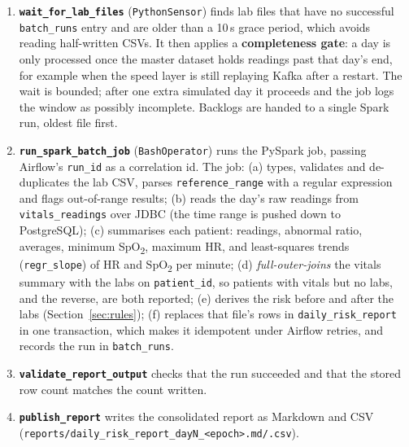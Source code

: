 \documentclass[11pt,a4paper]{article}
\newcommand{\code}[1]{\nolinkurl{#1}}
\begin{document}
\begin{enumerate}
  \item \textbf{\code{wait_for_lab_files}} (\code{PythonSensor}) finds lab files that have no
  successful \code{batch_runs} entry and are older than a 10\,s grace period, which avoids
  reading half-written CSVs. It then applies a \textbf{completeness gate}: a day is only processed
  once the master dataset holds readings past that day's end, for example when the speed layer
  is still replaying Kafka after a restart. The wait is bounded; after one extra simulated day it
  proceeds and the job logs the window as possibly incomplete. Backlogs are handed to a single
  Spark run, oldest file first.
  \item \textbf{\code{run_spark_batch_job}} (\code{BashOperator}) runs the PySpark job, passing
  Airflow's \code{run_id} as a correlation id. The job:
  (a) types, validates and de-duplicates the lab CSV, parses \code{reference_range} with a regular
  expression and flags out-of-range results;
  (b) reads the day's raw readings from \code{vitals_readings} over JDBC (the time range is
  pushed down to PostgreSQL);
  (c) summarises each patient: readings, abnormal ratio, averages, minimum SpO\textsubscript{2},
  maximum HR, and least-squares trends (\code{regr_slope}) of HR and SpO\textsubscript{2} per
  minute;
  (d) \emph{full-outer-joins} the vitals summary with the labs on \code{patient_id}, so patients
  with vitals but no labs, and the reverse, are both reported;
  (e) derives the risk before and after the labs (Section~\ref{sec:rules});
  (f) replaces that file's rows in \code{daily_risk_report} in one transaction, which makes it
  idempotent under Airflow retries, and records the run in \code{batch_runs}.
  \item \textbf{\code{validate_report_output}} checks that the run succeeded and that the stored
  row count matches the count written.
  \item \textbf{\code{publish_report}} writes the consolidated report as Markdown and CSV
  (\code{reports/daily_risk_report_dayN_<epoch>.md/.csv}).
\end{enumerate}
\end{document}
